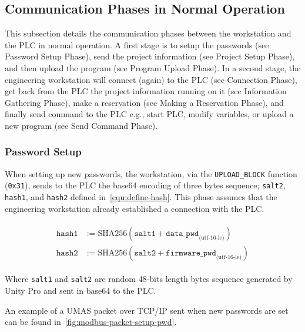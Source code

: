 \subsection{Communication Phases in Normal Operation}

This subsection details the communication phases between the workstation and the PLC in normal operation. A first stage is to setup the passwords (see Password Setup Phase), send the project information (see Project Setup Phase), and then upload the program (see Program Upload Phase). In a second stage, the engineering workstation will connect (again) to the PLC (see Connection Phase), get back from the PLC the project information running on it (see Information Gathering Phase), make a reservation (see Making a Reservation Phase), and finally send command to the PLC e.g., start PLC, modify variables, or upload a new program (see Send Command Phase). 

\subsubsection{Password Setup}
\label{subsubsection:pwd-setup}

When setting up new passwords, the workstation, via the \texttt{UPLOAD\_BLOCK} function (\texttt{0x31}), sends to the PLC the base64 encoding of three bytes sequence; \texttt{salt2}, \texttt{hash1}, and \texttt{hash2} defined in~\autoref{equ:define-hash}. This phase assumes that the engineering workstation already established a connection with the PLC.

\begin{align}
\label{equ:define-hash}
\begin{split}
    \texttt{hash1} &:= \textrm{SHA256}(\texttt{salt1} + \texttt{data\_pwd}_{\textrm{(utf-16-le)}}) \\
    \texttt{hash2} &:= \textrm{SHA256}(\texttt{salt2} + \texttt{firmware\_pwd}_{\textrm{(utf-16-le)}})
\end{split}
\end{align}

Where \texttt{salt1} and \texttt{salt2} are random 48-bits length bytes sequence generated by Unity Pro and sent in base64 to the PLC.

An example of a UMAS packet over TCP/IP sent when new passwords are set can be found in~\autoref{fig:modbus-packet-setup-pwd}.

